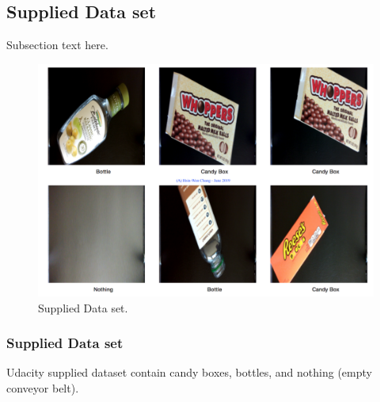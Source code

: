 \documentclass[10pt,journal,compsoc]{IEEEtran}
\begin{document}
\subsection{Supplied Data set}
Subsection text here.
\begin{figure}[thpb]
      \centering
      \includegraphics[width=\linewidth]{suplieDataset.png}
      \caption{Supplied Data set.}
      \label{fig:robot1}
\end{figure}
\subsubsection{Supplied Data set}
Udacity supplied dataset contain candy boxes, bottles, and nothing (empty conveyor belt).
\end{document}
